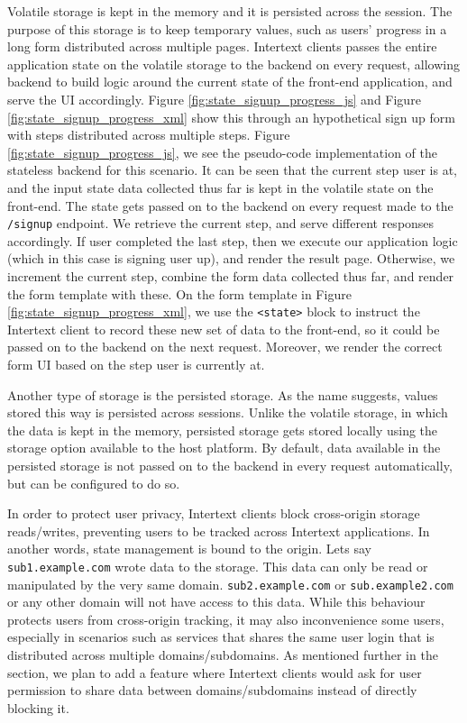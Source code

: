 Volatile storage is kept in the memory and it is persisted across the session. The purpose of this storage is to keep temporary values, such as users' progress in a long form distributed across multiple pages. Intertext clients passes the entire application state on the volatile storage to the backend on every request, allowing backend to build logic around the current state of the front-end application, and serve the UI accordingly. Figure \ref{fig:state_signup_progress_js} and Figure \ref{fig:state_signup_progress_xml} show this through an hypothetical sign up form with steps distributed across multiple steps. Figure \ref{fig:state_signup_progress_js}, we see the pseudo-code implementation of the stateless backend for this scenario. It can be seen that the current step user is at, and the input state data collected thus far is kept in the volatile state on the front-end. The state gets passed on to the backend on every request made to the \texttt{/signup} endpoint. We retrieve the current step, and serve different responses accordingly. If user completed the last step, then we execute our application logic (which in this case is signing user up), and render the result page. Otherwise, we increment the current step, combine the form data collected thus far, and render the form template with these. On the form template in Figure \ref{fig:state_signup_progress_xml}, we use the \texttt{<state>} block to instruct the Intertext client to record these new set of data to the front-end, so it could be passed on to the backend on the next request. Moreover, we render the correct form UI based on the step user is currently at.

Another type of storage is the persisted storage. As the name suggests, values stored this way is persisted across sessions. Unlike the volatile storage, in which the data is kept in the memory, persisted storage gets stored locally using the storage option available to the host platform. By default, data available in the persisted storage is not passed on to the backend in every request automatically, but can be configured to do so.

In order to protect user privacy, Intertext clients block cross-origin storage reads/writes, preventing users to be tracked across Intertext applications. In another words, state management is bound to the origin. Lets say \texttt{sub1.example.com} wrote data to the storage. This data can only be read or manipulated by the very same domain. \texttt{sub2.example.com} or \newline\texttt{sub.example2.com} or any other domain will not have access to this data. While this behaviour protects users from cross-origin tracking, it may also inconvenience some users, especially in scenarios such as services that shares the same user login that is distributed across multiple domains/subdomains. As mentioned further in the  section, we plan to add a feature where Intertext clients would ask for user permission to share data between domains/subdomains instead of directly blocking it.

